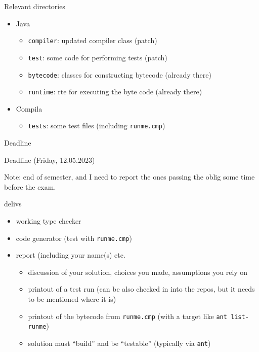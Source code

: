 \documentclass{beamer}
\begin{document}
\begin{frame}[label={sec:org50e256c},fragile]{Relevant directories}
 \begin{itemize}
\item Java

\begin{itemize}
\item \texttt{compiler}: updated compiler class (patch)
\item \texttt{test}:   some code for performing tests (patch)
\item \texttt{bytecode}: classes for constructing bytecode (already there)
\item \texttt{runtime}: rte for executing the byte code (already there)
\end{itemize}

\item Compila

\begin{itemize}
\item \texttt{tests}: some test files (including \texttt{runme.cmp})
\end{itemize}
\end{itemize}
\end{frame}
\begin{frame}[label={sec:org2afbbae},fragile]{Deadline}
 \begin{alertblock}{Deadline}
(Friday, 12.05.2023)
\end{alertblock}
Note: end of semester, and I need to report the ones passing the oblig some
time before the exam.
\begin{block}{delivs}
\begin{itemize}
\item working type checker
\item code generator (test with \texttt{runme.cmp})
\item report (including your name(s) etc.

\begin{itemize}
\item discussion of your solution, choices you made, assumptions you rely on

\item printout of a test run (can be also checked in into the repos, but it 
needs to be mentioned where it is)
\item printout of the bytecode from \texttt{runme.cmp} (with a target like \texttt{ant
    list-runme})

\item solution must ``build'' and be ``testable'' (typically via \texttt{ant})
\end{itemize}
\end{itemize}
\end{block}
\end{frame}
\end{document}
